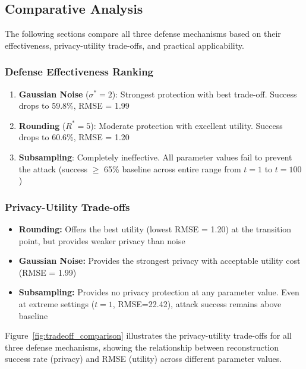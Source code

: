 \documentclass[11pt,letterpaper]{article}
\begin{document}
\subsection{Comparative Analysis}

The following sections compare all three defense mechanisms based on their effectiveness, privacy-utility trade-offs, and practical applicability.

\subsubsection{Defense Effectiveness Ranking}

\begin{enumerate}[leftmargin=*]
    \item \textbf{Gaussian Noise} ($\sigma^* = 2$): Strongest protection with best trade-off. Success drops to 59.8\%, RMSE = 1.99
    \item \textbf{Rounding} ($R^* = 5$): Moderate protection with excellent utility. Success drops to 60.6\%, RMSE = 1.20
    \item \textbf{Subsampling}: Completely ineffective. All parameter values fail to prevent the attack (success $\geq$ 65\% baseline across entire range from $t=1$ to $t=100$)
\end{enumerate}

\subsubsection{Privacy-Utility Trade-offs}

\begin{itemize}[leftmargin=*]
    \item \textbf{Rounding:} Offers the best utility (lowest RMSE = 1.20) at the transition point, but provides weaker privacy than noise
    \item \textbf{Gaussian Noise:} Provides the strongest privacy with acceptable utility cost (RMSE = 1.99)
    \item \textbf{Subsampling:} Provides no privacy protection at any parameter value. Even at extreme settings ($t=1$, RMSE=22.42), attack success remains above baseline
\end{itemize}

Figure~\ref{fig:tradeoff_comparison} illustrates the privacy-utility trade-offs for all three defense mechanisms, showing the relationship between reconstruction success rate (privacy) and RMSE (utility) across different parameter values.
\end{document}
